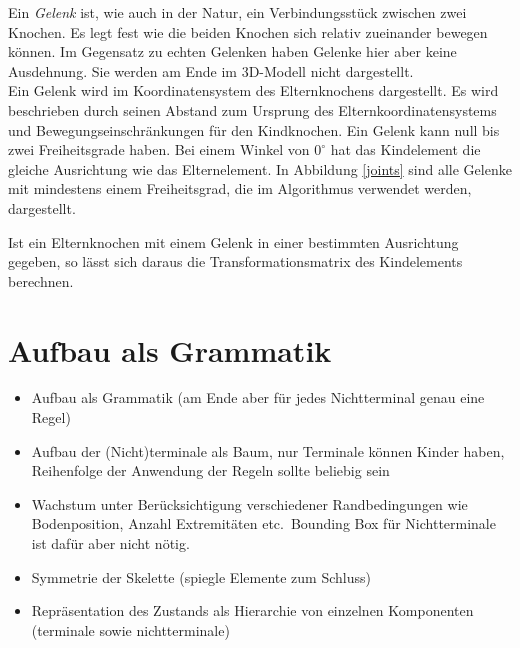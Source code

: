 Ein \emph{Gelenk} ist, wie auch in der Natur, ein Verbindungsstück zwischen zwei Knochen. Es legt fest wie die beiden Knochen sich relativ zueinander bewegen können. Im Gegensatz zu echten Gelenken haben Gelenke hier aber keine Ausdehnung. Sie werden am Ende im 3D-Modell nicht dargestellt.\\
Ein Gelenk wird im Koordinatensystem des Elternknochens dargestellt. Es wird beschrieben durch seinen Abstand zum Ursprung des Elternkoordinatensystems und Bewegungseinschränkungen für den Kindknochen. Ein Gelenk kann null bis zwei Freiheitsgrade haben. Bei einem Winkel von $0^\circ$ hat das Kindelement die gleiche Ausrichtung wie das Elternelement. In Abbildung \ref{joints} sind alle Gelenke mit mindestens einem Freiheitsgrad, die im Algorithmus verwendet werden, dargestellt.

Ist ein Elternknochen mit einem Gelenk in einer bestimmten Ausrichtung gegeben, so lässt sich daraus die Transformationsmatrix des Kindelements berechnen.


\section{Aufbau als Grammatik}

\begin{itemize}
  \item Aufbau als Grammatik (am Ende aber für jedes Nichtterminal genau eine Regel)
  \item Aufbau der (Nicht)terminale als Baum, nur Terminale können Kinder haben, Reihenfolge der Anwendung der Regeln sollte beliebig sein
  \item Wachstum unter Berücksichtigung verschiedener Randbedingungen wie Bodenposition, Anzahl Extremitäten etc.\ Bounding Box für Nichtterminale ist dafür aber nicht nötig.
  \item Symmetrie der Skelette (spiegle Elemente zum Schluss)
  \item Repräsentation des Zustands als Hierarchie von einzelnen Komponenten (terminale sowie nichtterminale)
 \end{itemize}
 
